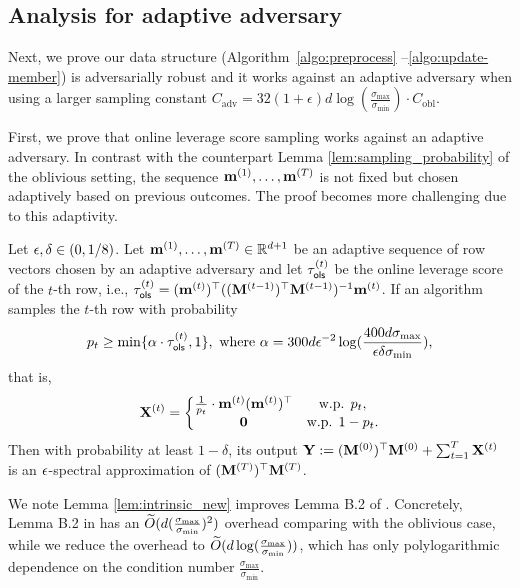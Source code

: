 \subsection{Analysis for adaptive adversary}\label{sec:upper_robust}



Next, we prove our data structure (Algorithm~\ref{algo:preprocess} --\ref{algo:update-member}) is adversarially robust and it works against an adaptive adversary when using a larger sampling constant $C_{\mathrm{adv}} = 32 (1 + \epsilon) d \log(\frac{\sigma_{\max}}{\sigma_{\min}}) \cdot C_{\mathrm{obl}}$.


First, we prove that online leverage score sampling works against an adaptive adversary. In contrast with the counterpart Lemma \ref{lem:sampling_probability} of the oblivious setting, the sequence $\mathbf{m}^{(1)}, \ldots, \mathbf{m}^{(T)}$ is not fixed but chosen adaptively based on previous outcomes. The proof becomes more challenging due to this adaptivity.
\begin{lemma}
\label{lem:intrinsic_new}
Let $\epsilon, \delta \in (0, 1/8)$. 
Let $\mathbf{m}^{(1)}, \ldots, \mathbf{m}^{(T)} \in \mathbb{R}^{d+1}$ be an adaptive sequence of row vectors chosen by an adaptive adversary and let $\tau_{\mathsf{ols}}^{(t)}$ be the online leverage score of the $t$-th row, i.e., $\tau_{\mathsf{ols}}^{(t)} = (\mathbf{m}^{(t)})^\top ((\mathbf{M}^{(t-1)})^\top \mathbf{M}^{(t-1)})^{-1} \mathbf{m}^{(t)}$. If an algorithm samples the $t$-th row with probability 
\[
p_{t} \geq \min\{\alpha \cdot \tau_{\mathsf{ols}}^{(t)}, 1\}, \text{ where } \alpha = 300 d \epsilon^{-2} \log(\frac{400d \sigma_{\max}}{\epsilon \delta \sigma_{\min} }),
\]
that is,
\begin{align*}
\mathbf{X}^{(t)} =  \left\{
\begin{matrix}
\frac{1}{p_t} \cdot  \mathbf{m}^{(t)} (\mathbf{m}^{(t)})^\top & \text{w.p. } p_t,\\
\mathbf{0} & \text{w.p. } 1 - p_t.\\
\end{matrix}
\right.
\end{align*}
Then with probability at least $1-\delta$, its output $\mathbf{Y} := (\mathbf{M}^{(0)})^\top \mathbf{M}^{(0)} + \sum_{t=1}^{T}\mathbf{X}^{(t)}$ is an $\epsilon$-spectral approximation of $(\mathbf{M}^{(T)})^\top \mathbf{M}^{(T)}$.
\end{lemma}



We note Lemma \ref{lem:intrinsic_new} improves Lemma B.2 of \cite{bhm+21}. Concretely, Lemma B.2 in \cite{bhm+21} has an $\widetilde{O}(d (\frac{\sigma_{\max}}{\sigma_{\min}})^2)$ overhead comparing with the oblivious case, while we reduce the overhead to $\widetilde{O}(d \log (\frac{\sigma_{\max}}{\sigma_{\min}}))$, which has only polylogarithmic dependence on the condition number $\frac{\sigma_{\max}}{\sigma_{\min}}$.




